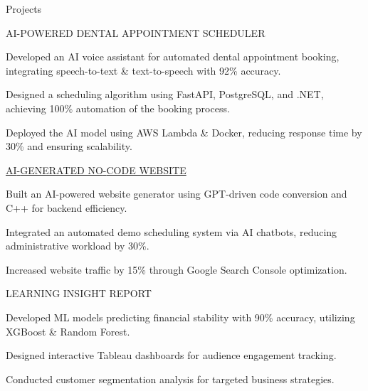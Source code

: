 \documentclass{resume} %
\begin{document}
    \begin{rSection}{Projects}
                    \begin{rSubsection}
                                    {AI{-}POWERED DENTAL APPOINTMENT SCHEDULER}
                                {}{}{}
                                    \item Developed an AI voice assistant for automated dental appointment booking, integrating speech{-}to{-}text \& text{-}to{-}speech with 92\% accuracy.
                                    \item Designed a scheduling algorithm using FastAPI, PostgreSQL, and .NET, achieving 100\% automation of the booking process.
                                    \item Deployed the AI model using AWS Lambda \& Docker, reducing response time by 30\% and ensuring scalability.
                            \end{rSubsection}
                    \begin{rSubsection}
                                    {\href{www.civaroai.com}{AI{-}GENERATED NO{-}CODE WEBSITE}}
                                {}{}{}
                                    \item Built an AI{-}powered website generator using GPT{-}driven code conversion and C++ for backend efficiency.
                                    \item Integrated an automated demo scheduling system via AI chatbots, reducing administrative workload by 30\%.
                                    \item Increased website traffic by 15\% through Google Search Console optimization.
                            \end{rSubsection}
                    \begin{rSubsection}
                                    {LEARNING INSIGHT REPORT}
                                {}{}{}
                                    \item Developed ML models predicting financial stability with 90\% accuracy, utilizing XGBoost \& Random Forest.
                                    \item Designed interactive Tableau dashboards for audience engagement tracking.
                                    \item Conducted customer segmentation analysis for targeted business strategies.

\end{rSubsection}
\end{rSection}
\end{document}
